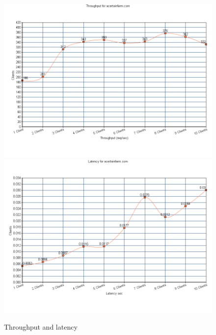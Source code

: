 \documentclass{article}      %
\begin{document}
\begin{figure}[ht]
\centering

{%
\setlength{\fboxsep}{5pt}%
\includegraphics[scale=.23]{img/throughput}%
\includegraphics[scale=.23]{img/latency}%
}%
\caption{Throughput and latency\label{overflow}}
\end{figure}
\end{document}
